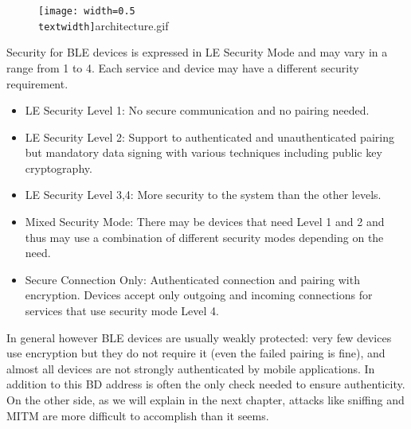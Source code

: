 \begin{figure}
	\centering	
	\texttt{[image: width=0.5\\textwidth]}{architecture.gif}
	\label{fig:architecture}
\end{figure}

Security for BLE devices is expressed in LE Security Mode and may vary in a range from 1 to 4.
Each service and device may have a different security requirement.
\begin{itemize}
	\item LE Security Level 1: No secure communication and no pairing needed.
	\item LE Security Level 2: Support to authenticated and unauthenticated pairing but mandatory data signing with various techniques including public key cryptography.
	\item LE Security Level 3,4: More security to the system than the other levels.
	\item Mixed Security Mode: There may be devices that need Level 1 and 2 and thus may use a combination of different security modes depending on the need.
	\item Secure Connection Only: Authenticated connection and pairing with encryption. Devices accept only outgoing and incoming connections for services that use security mode Level 4.
\end{itemize}

In general however BLE devices are usually weakly protected: very few devices use encryption but they do not require it (even the failed pairing is fine), and almost all devices are not strongly authenticated by mobile applications.
In addition to this BD address is often the only check needed to ensure authenticity. On the other side, as we will explain in the next chapter, attacks like sniffing and MITM are more difficult to accomplish than it seems.


